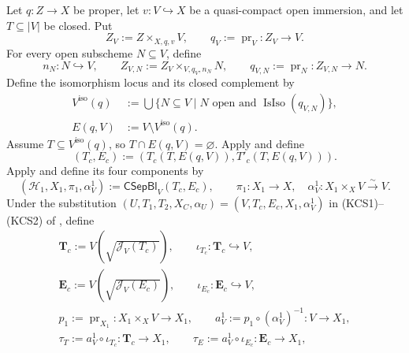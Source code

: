 \begin{definition}
  \label{def:nagata-isomorphism-near-closure}
  \lean{}

  Let $q\colon Z\to X$ be proper, let $v\colon V\hookrightarrow X$ be a
  quasi-compact open immersion, and let $T\subseteq|V|$ be closed.  Put
  \[
    Z_V:=Z\times_{X,q,v}V,
    \qquad
    q_V:=\operatorname{pr}_V\colon Z_V\longrightarrow V.           \tag{INC-1}
  \]
  For every open subscheme $N\subseteq V$, define
  \[
    n_N\colon N\hookrightarrow V,\qquad
    Z_{V,N}:=Z_V\times_{V,q_V,n_N}N,\qquad
    q_{V,N}:=\operatorname{pr}_N\colon Z_{V,N}\to N.               \tag{INC-0}
  \]
  Define the isomorphism locus and its closed complement by
  \[
  \begin{aligned}
    V^{\mathrm{iso}}(q)
      &:=\bigcup\{N\subseteq V\mid N\text{ open and }
         \operatorname{IsIso}(q_{V,N})\},\\
    E(q,V)&:=V\setminus V^{\mathrm{iso}}(q).
  \end{aligned}
  \]
  Assume $T\subseteq V^{\mathrm{iso}}(q)$, so
  $T\cap E(q,V)=\varnothing$.  Apply
   and define
  \[
    (T_c,E_c):=
      (T_c(T,E(q,V)),T'_c(T,E(q,V))).
  \]
  Apply  and define its four
  components by
  \[
    (\mathcal H_1,X_1,\pi_1,\alpha_V^1)
      :=\mathsf{CSepBl}_V(T_c,E_c),\qquad
    \pi_1\colon X_1\to X,\quad
    \alpha_V^1\colon X_1\times_XV\xrightarrow{\sim}V.              \tag{INC0a}
  \]
  Under the substitution
  $(U,T_1,T_2,X_C,\alpha_U)=(V,T_c,E_c,X_1,\alpha_V^1)$ in
  (KCS1)--(KCS2) of , define
  \[
  \begin{gathered}
    \mathbf T_c:=V(\sqrt{\mathcal J_V(T_c)}),\qquad
    \iota_{T_c}\colon\mathbf T_c\hookrightarrow V,\\
    \mathbf E_c:=V(\sqrt{\mathcal J_V(E_c)}),\qquad
    \iota_{E_c}\colon\mathbf E_c\hookrightarrow V,\\
    p_1:=\operatorname{pr}_{X_1}\colon X_1\times_XV\to X_1,
    \qquad
    a_V^1:=p_1\circ(\alpha_V^1)^{-1}\colon V\to X_1,\\
    \tau_T:=a_V^1\circ\iota_{T_c}\colon\mathbf T_c\to X_1,
    \qquad
    \tau_E:=a_V^1\circ\iota_{E_c}\colon\mathbf E_c\to X_1,\\

\end{gathered}\]
\end{definition}

